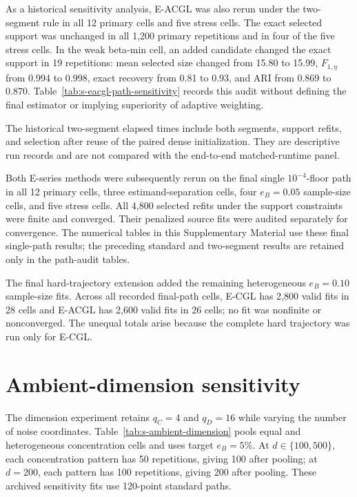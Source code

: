 \documentclass[preprint,12pt,authoryear]{elsarticle}
\begin{document}
As a historical sensitivity analysis, E-ACGL was also rerun under the
two-segment rule in all 12 primary cells and five stress cells. The exact
selected support was unchanged in all 1,200 primary repetitions and in four
of the five stress cells. In the weak beta-min cell, an added candidate changed
the exact support in 19 repetitions: mean selected size changed from 15.80 to
15.99, $F_{1,\eta}$ from 0.994 to 0.998, exact recovery from 0.81 to 0.93, and
ARI from 0.869 to 0.870. Table~\ref{tab:s-eacgl-path-sensitivity} records this
audit without defining the final estimator or implying superiority of
adaptive weighting.

\clearpage


The historical two-segment elapsed times include both segments, support
refits, and selection after reuse of the paired dense initialization. They are
descriptive run records and are not compared with the end-to-end
matched-runtime panel.

Both E-series methods were subsequently rerun on the final single
$10^{-4}$-floor path in all 12 primary cells, three estimand-separation cells,
four $e_B=0.05$ sample-size cells, and five stress cells. All 4,800 selected
refits under the support constraints were finite and converged. Their
penalized source fits were audited separately for convergence. The numerical
tables in this Supplementary Material use these final single-path results;
the preceding standard and two-segment results are retained only in the
path-audit tables.

The final hard-trajectory extension added the remaining heterogeneous
$e_B=0.10$ sample-size fits. Across all recorded final-path cells, E-CGL has
2,800 valid fits in 28 cells and E-ACGL has 2,600 valid fits in 26 cells; no
fit was nonfinite or nonconverged. The unequal totals arise because the
complete hard trajectory was run only for E-CGL.

\section{Ambient-dimension sensitivity}
\label{sec:s-ambient-dimension}

The dimension experiment retains $q_C=4$ and $q_D=16$ while varying the number
of noise coordinates. Table~\ref{tab:s-ambient-dimension} pools equal and heterogeneous
concentration cells and uses target $e_B=5\%$. At $d\in\{100,500\}$, each
concentration pattern has 50 repetitions, giving 100 after pooling; at $d=200$,
each pattern has 100 repetitions, giving 200 after pooling. These archived
sensitivity fits use 120-point standard paths.
\end{document}
